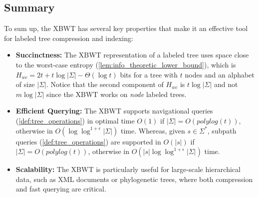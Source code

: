 \subsection{Summary}
To sum up, the XBWT has several key properties that make it an effective tool for labeled tree compression and indexing:
\begin{itemize}
    \item \textbf{Succinctness:} The XBWT representation of a labeled tree uses space close to the worst-case entropy (\cref{lem:info_theoretic_lower_bound}), which is \(H_{wc} = 2t + t \log |\Sigma| - \Theta(\log t) \) bits for a tree with $t$ nodes and an alphabet of size $|\Sigma|$.
    Notice that the second component of $H_{wc}$ is $t\log |\Sigma|$ and not $m\log |\Sigma|$ since the XBWT works on \emph{node} labeled trees.
    \item \textbf{Efficient Querying:} The XBWT supports navigational queries (\cref{def:tree_operations}) in optimal time $O(1)$ if $|\Sigma| = O(polylog(t))$, otherwise in $O(\log\log^{1+\epsilon} |\Sigma|)$ time. Whereas, given $s \in \Sigma^*$, subpath queries (\cref{def:tree_operations}) are supported in $O(|s|)$ if $|\Sigma| = O(polylog(t))$, otherwise in $O(|s| \log\log^{1+\epsilon} |\Sigma|)$ time.
    \item \textbf{Scalability:} The XBWT is particularly useful for large-scale hierarchical data, such as XML documents or phylogenetic trees, where both compression and fast querying are critical.
\end{itemize}